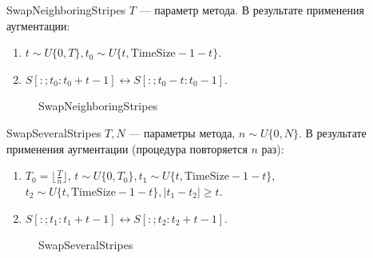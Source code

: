 \documentclass[12pt, fleqn]{beamer}
\begin{document}
\begin{frame}{SwapNeighboringStripes}
	 $T$ --- параметр метода. \newline В результате применения аугментации:
        \begin{enumerate}
            \item $t \sim U\{0, T\}, t_0 \sim U\{t, \text{TimeSize} - 1 - t\}.$
            \item $S[:; t_0: t_0 + t - 1] \leftrightarrow S[:; t_0 - t: t_0 - 1].$
        \end{enumerate}
    \begin{figure}[ht!]
    	\caption{SwapNeighboringStripes}
    	\label{fig:i1}
    \end{figure}
\end{frame}

\begin{frame}{SwapSeveralStripes}
     $T, N$ --- параметры метода, $n \sim U\{0, N\}$. \newline
    	В результате применения аугментации (процедура повторяется $n$ раз):
	\begin{enumerate}
        \item $T_0 = \lfloor \frac{T}{n} \rfloor$, $t \sim U\{0, T_0\}, t_1 \sim U\{t, \text{TimeSize} - 1 - t\},$ \newline $t_2 \sim U\{t, \text{TimeSize} - 1 - t\}, |t_1 - t_2| \geq t.$
        \item $S[:; t_1: t_1 + t - 1] \leftrightarrow S[:; t_2 : t_2 + t - 1]$.
       \end{enumerate}
    \begin{figure}[ht!]
    	\caption{SwapSeveralStripes}
    	\label{fig:i2}
    \end{figure}
\end{frame}
\end{document}
